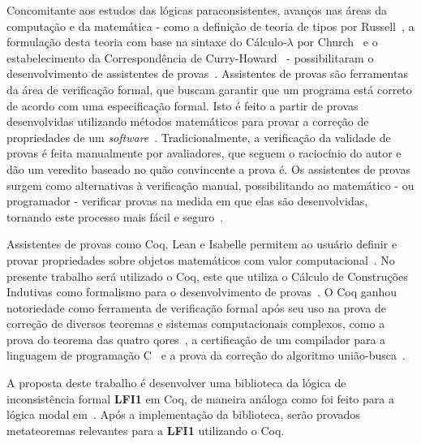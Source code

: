 Concomitante aos estudos das lógicas paraconsistentes, avanços nas áreas da computação e da matemática {-} como a definição de teoria de tipos por Russell~\cite{russell1903principles,Russell1908-RUSMLA}, a formulação desta teoria com base na sintaxe do Cálculo-$\lambda$ por Church~\cite{church1940formulation} e o estabelecimento da Correspondência de Curry-Howard~\cite{curry1958combinatory,howard1980formulae} {-} possibilitaram o desenvolvimento de assistentes de provas~\cite{harrison2014history}. Assistentes de provas são ferramentas da área de verificação formal, que buscam garantir que um programa está correto de acordo com uma especificação formal. Isto é feito a partir de provas desenvolvidas utilizando métodos matemáticos para provar a correção de propriedades de um \textit{software}~\cite{Chlipala_2013}. Tradicionalmente, a verificação da validade de provas é feita manualmente por avaliadores, que seguem o raciocínio do autor e dão um veredito baseado no quão convincente a prova é. Os assistentes de provas surgem como alternativas à verificação manual, possibilitando ao matemático {-} ou programador {-} verificar provas na medida em que elas são desenvolvidas, tornando este processo mais fácil e seguro~\cite{paulinmohring:hal-01094195}.

Assistentes de provas como Coq, Lean e Isabelle permitem ao usuário definir e provar propriedades sobre objetos matemáticos com valor computacional~\cite{geuvers2009proof}. No presente trabalho será utilizado o Coq, este que utiliza o Cálculo de Construções Indutivas como formalismo para o desenvolvimento de provas~\cite{TEAM_2024}. O Coq ganhou notoriedade como ferramenta de verificação formal após seu uso na prova de correção de diversos teoremas e sistemas computacionais complexos, como a prova do teorema das quatro qores~\cite{geuvers2009proof}, a certificação de um compilador para a linguagem de programação C~\cite{leroy2021compcert} e a prova da correção do algoritmo união-busca~\cite{union-find}.

A proposta deste trabalho é desenvolver uma biblioteca da lógica de inconsistência formal \textbf{LFI1} em Coq, de maneira análoga como foi feito para a lógica modal em~\cite{silveira2020implementacao}. Após a implementação da biblioteca, serão provados metateoremas relevantes para a \textbf{LFI1} utilizando o Coq.



